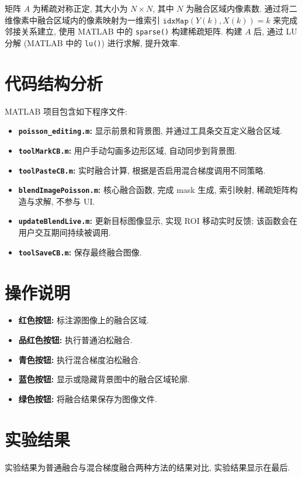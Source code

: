 \documentclass[11pt,a4paper]{article}
\begin{document}
			矩阵 $A$ 为稀疏对称正定, 其大小为 $N \times N$, 其中 $N$ 为融合区域内像素数. 通过将二维像素中融合区域内的像素映射为一维索引 $\texttt{idxMap}(Y(k), X(k)) = k$ 来完成邻接关系建立, 使用 MATLAB 中的 \texttt{sparse()} 构建稀疏矩阵. 构建 $A$ 后, 通过 LU 分解 (MATLAB 中的 \texttt{lu()}) 进行求解, 提升效率.

	\section{代码结构分析}
		MATLAB 项目包含如下程序文件:

		\begin{itemize}
			\item \textbf{\texttt{poisson\_editing.m}:} 显示前景和背景图, 并通过工具条交互定义融合区域.
			\item \textbf{\texttt{toolMarkCB.m}:} 用户手动勾画多边形区域, 自动同步到背景图.
			\item \textbf{\texttt{toolPasteCB.m}:} 实时融合计算, 根据是否启用混合梯度调用不同策略.
			\item \textbf{\texttt{blendImagePoisson.m}:} 核心融合函数, 完成 mask 生成, 索引映射, 稀疏矩阵构造与求解, 不参与 UI.
			\item \textbf{\texttt{updateBlendLive.m}:} 更新目标图像显示, 实现 ROI 移动实时反馈; 该函数会在用户交互期间持续被调用.
			\item \textbf{\texttt{toolSaveCB.m}:} 保存最终融合图像.
		\end{itemize}

	\section{操作说明}
		\begin{itemize}
			\item \textbf{红色按钮:} 标注源图像上的融合区域.
			\item \textbf{品红色按钮:} 执行普通泊松融合.
			\item \textbf{青色按钮:} 执行混合梯度泊松融合.
			\item \textbf{蓝色按钮:} 显示或隐藏背景图中的融合区域轮廓.
			\item \textbf{绿色按钮:} 将融合结果保存为图像文件.
		\end{itemize}

	\section{实验结果}
		实验结果为普通融合与混合梯度融合两种方法的结果对比, 实验结果显示在最后.
\end{document}
